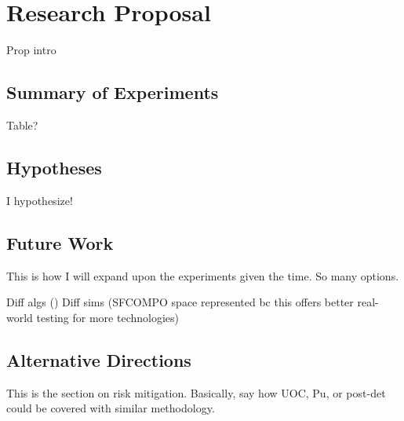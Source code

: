 \chapter{Research Proposal}
\label{ch:proposal}

Prop intro

\section{Summary of Experiments}
\label{sec:summary}

Table?

\section{Hypotheses}
\label{sec:hypotheses}

I hypothesize!

\section{Future Work}
\label{sec:expand}

This is how I will expand upon the experiments given the time.  So many
options.

Diff algs ()
Diff sims (SFCOMPO space represented bc this offers better real-world testing for more technologies)

\section{Alternative Directions}
\label{sec:riskmitig}

This is the section on risk mitigation. Basically, say how \gls{UOC}, Pu, or
post-det could be covered with similar methodology.
